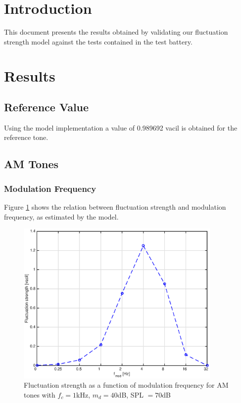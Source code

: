 \documentclass[a4paper]{article}
\begin{document}

\section{Introduction}

This document presents the results obtained by validating our fluctuation
strength model against the tests contained in the test battery.

\section{Results}

\subsection{Reference Value}

Using the model implementation a value of 0.989692 vacil is obtained for the
reference tone.

\subsection{AM Tones}

\subsubsection{Modulation Frequency}

Figure \ref{fig:AMtonesfmplot} shows the relation between fluctuation strength
and modulation frequency, as estimated by the model.

\begin{figure}[ht]
    \centering
    \includegraphics[height=8cm]{img/am_tones_fm_plot}
    \caption{Fluctuation strength as a function of modulation frequency for AM
        tones with $f_c = 1 $kHz, $m_d = 40 $dB, SPL $= 70 $dB}
    \label{fig:AMtonesfmplot}
\end{figure}
\end{document}
